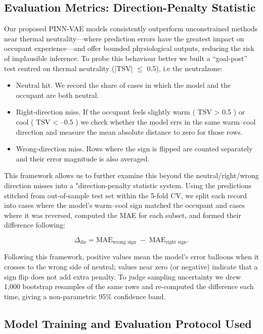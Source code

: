 \subsection{Evaluation Metrics: Direction-Penalty Statistic}
Our proposed PINN-VAE models consistently outperform unconstrained methods near thermal neutrality—where prediction errors have the greatest impact on occupant experience—and offer bounded physiological outputs, reducing the risk of implausible inference. To probe this behaviour better we built a “goal-post” test centred on thermal neutrality (|TSV| $\leq$ 0.5), i.e the \gls{neutralzone}:
\begin{itemize}
    \item Neutral hit. We record the share of cases in which the model and the occupant are both neutral.
    \item Right-direction miss. If the occupant feels slightly warm ( TSV > 0.5 ) or cool ( TSV < –0.5 ) we check whether the model errs in the same warm–cool direction and measure the mean absolute distance to zero for those rows.
    \item {Wrong-direction miss.} Rows where the sign is flipped are counted separately and their error magnitude is also averaged.
\end{itemize}
This framework allows us to further examine this beyond the neutral/right/wrong direction misses into a "direction-penalty statistic system. Using the predictions stitched from out-of-sample test set within the 5-fold CV, we split each record into cases where the model’s warm–cool sign matched the occupant and cases where it was reversed, computed the MAE for each subset, and formed their difference following:

\[
\Delta_{\text{dir}}
     = \text{MAE}_{\text{wrong sign}}
       \;-\;
       \text{MAE}_{\text{right sign}} .
\]

Following this framework, positive values mean the model’s error balloons when it crosses to the wrong side of neutral; values near zero (or negative) indicate that a sign flip does not add extra penalty.  To judge sampling uncertainty we drew 1,000 bootstrap resamples of the same rows and re-computed the difference each time, giving a non-parametric 95\% confidence band.

\subsection{Model Training and Evaluation Protocol Used}

